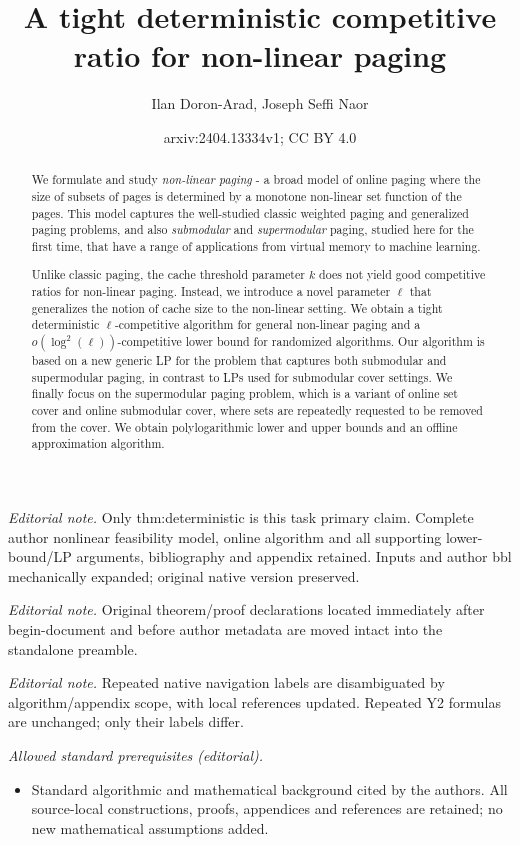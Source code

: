 \documentclass[11pt]{article}
\title{A tight deterministic competitive ratio for non-linear paging}
\author{Ilan Doron-Arad, Joseph Seffi Naor}
\date{arxiv:2404.13334v1; CC BY 4.0}
\begin{document}
\maketitle
\noindent\textit{Editorial note.} Only thm:deterministic is this task primary claim. Complete author nonlinear feasibility model, online algorithm and all supporting lower-bound/LP arguments, bibliography and appendix retained. Inputs and author bbl mechanically expanded; original native version preserved.\par\medskip
\noindent\textit{Editorial note.} Original theorem/proof declarations located immediately after begin-document and before author metadata are moved intact into the standalone preamble.\par\medskip
\noindent\textit{Editorial note.} Repeated native navigation labels are disambiguated by algorithm/appendix scope, with local references updated. Repeated Y2 formulas are unchanged; only their labels differ.\par\medskip
\noindent\textit{Allowed standard prerequisites (editorial).}\begin{itemize}
\item Standard algorithmic and mathematical background cited by the authors. All source-local constructions, proofs, appendices and references are retained; no new mathematical assumptions added.
\end{itemize}\medskip



\begin{abstract}
We formulate and study {\em non-linear paging} - a broad model of online paging where the size of subsets of pages is determined by a monotone non-linear set function of the pages. This model captures the well-studied classic weighted paging and generalized paging problems, and also {\em submodular} and {\em supermodular} paging, studied here for the first time, that have a range of applications from virtual memory to machine learning. 

Unlike classic paging, the cache threshold parameter $k$ does not yield good competitive ratios for non-linear paging. Instead, we introduce a novel parameter $\ell$ that generalizes the notion of cache size to the non-linear setting. We obtain a tight deterministic $\ell$-competitive algorithm for general non-linear paging and a $o\left(\log^2 (\ell)\right)$-competitive lower bound for randomized algorithms. Our algorithm is based on a new generic LP for the problem that captures both submodular and supermodular paging, in contrast to LPs used for submodular cover settings. 
We finally focus on the supermodular paging problem, which is a variant of online set cover and online submodular cover, where sets are repeatedly requested to be removed from the cover. We obtain  polylogarithmic lower and upper bounds and an offline approximation algorithm.  

\end{abstract}
\end{document}
